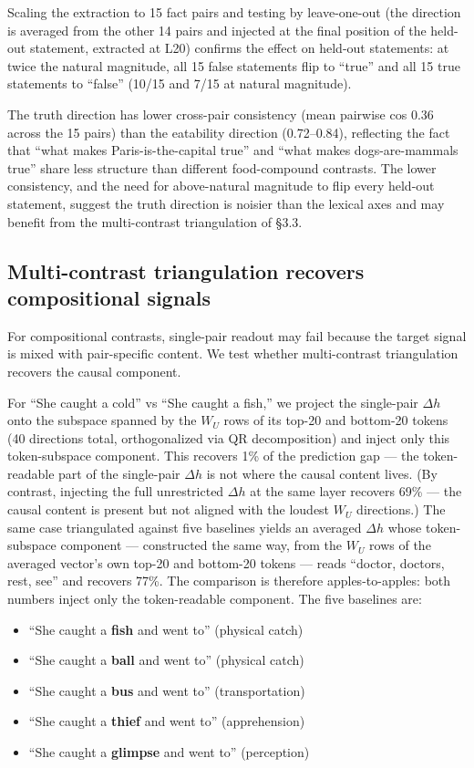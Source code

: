 \documentclass[11pt]{article}
\newcommand{\dhh}{\Delta h}
\newcommand{\WU}{W_U}
\begin{document}
Scaling the extraction to 15 fact pairs and testing by leave-one-out
(the direction is averaged from the other 14 pairs and injected at the
final position of the held-out statement, extracted at L20) confirms
the effect on held-out statements: at twice the natural magnitude, all
15 false statements flip to ``true'' and all 15 true statements to
``false'' (10/15 and 7/15 at natural magnitude).

The truth direction has lower cross-pair consistency (mean pairwise
cos 0.36 across the 15 pairs) than the
eatability direction (0.72--0.84), reflecting the fact that ``what makes Paris-is-the-capital
true'' and ``what makes dogs-are-mammals true'' share less structure
than different food-compound contrasts. The lower consistency, and the
need for above-natural magnitude to flip every held-out statement,
suggest the truth direction is noisier than the lexical axes and may
benefit from the multi-contrast triangulation of \S3.3.

\subsection{Multi-contrast triangulation recovers compositional signals}

For compositional contrasts, single-pair readout may fail because the
target signal is mixed with pair-specific content. We test whether
multi-contrast triangulation recovers the causal component.

For ``She caught a cold'' vs ``She caught a fish,'' we project the single-pair
$\dhh$ onto the subspace spanned by the $\WU$ rows of its top-20 and bottom-20
tokens (40 directions total, orthogonalized via QR decomposition) and
inject only this token-subspace component. This recovers 1\% of the
prediction gap --- the token-readable part of the single-pair $\dhh$ is not
where the causal content lives. (By contrast, injecting the full
unrestricted $\dhh$ at the same layer recovers 69\% --- the causal content is
present but not aligned with the loudest $\WU$ directions.) The same case
triangulated against five baselines yields an averaged $\dhh$ whose
token-subspace component --- constructed the same way, from the $\WU$
rows of the averaged vector's own top-20 and bottom-20 tokens --- reads
``doctor, doctors, rest, see'' and recovers 77\%. The comparison is
therefore apples-to-apples: both numbers inject only the token-readable
component. The five baselines are:

\begin{itemize}[leftmargin=*]
\item ``She caught a \textbf{fish} and went to'' (physical catch)
\item ``She caught a \textbf{ball} and went to'' (physical catch)
\item ``She caught a \textbf{bus} and went to'' (transportation)
\item ``She caught a \textbf{thief} and went to'' (apprehension)
\item ``She caught a \textbf{glimpse} and went to'' (perception)
\end{itemize}
\end{document}
